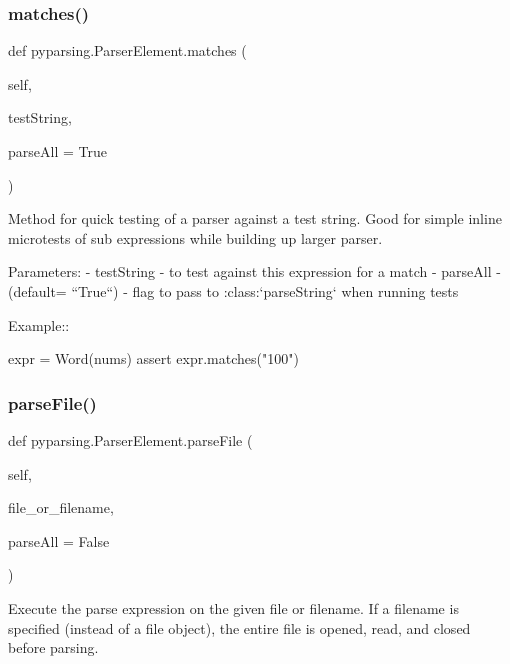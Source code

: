 \subsubsection{\texorpdfstring{matches()}{matches()}}
{\footnotesize\ttfamily def pyparsing.\+Parser\+Element.\+matches (\begin{DoxyParamCaption}\item[{}]{self,  }\item[{}]{test\+String,  }\item[{}]{parse\+All = {\ttfamily True} }\end{DoxyParamCaption})}

\begin{DoxyVerb}Method for quick testing of a parser against a test string. Good for simple
inline microtests of sub expressions while building up larger parser.

Parameters:
 - testString - to test against this expression for a match
 - parseAll - (default= ``True``) - flag to pass to :class:`parseString` when running tests

Example::

    expr = Word(nums)
    assert expr.matches("100")
\end{DoxyVerb}
 \mbox{\label{classpyparsing_1_1ParserElement_a5076b859e68470bd5fbe3f993be3e187}} 
\subsubsection{\texorpdfstring{parse\+File()}{parseFile()}}
{\footnotesize\ttfamily def pyparsing.\+Parser\+Element.\+parse\+File (\begin{DoxyParamCaption}\item[{}]{self,  }\item[{}]{file\+\_\+or\+\_\+filename,  }\item[{}]{parse\+All = {\ttfamily False} }\end{DoxyParamCaption})}

\begin{DoxyVerb}Execute the parse expression on the given file or filename.
If a filename is specified (instead of a file object),
the entire file is opened, read, and closed before parsing.
\end{DoxyVerb}
 \mbox{\label{classpyparsing_1_1ParserElement_a329bcec7d8f7ef6875b9390787536e5b}} 
